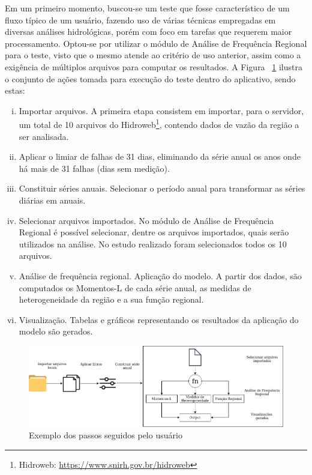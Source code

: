 \documentclass[12pt,english,brazil]{article}
\begin{document}
Em um primeiro momento, buscou-se um teste que fosse característico de um fluxo típico de um usuário, fazendo uso de várias técnicas empregadas em diversas análises hidrológicas, porém com foco em tarefas que requerem maior processamento. Optou-se por utilizar o módulo de Análise de Frequência Regional para o teste, visto que o mesmo atende ao critério de uso anterior, assim como a exigência de múltiplos arquivos para computar os resultados. A Figura ~\ref{usoWebSYHDA} ilustra o conjunto de ações tomada para execução do teste dentro do aplicativo, sendo estas:


\begin{enumerate}[i.]
  \item Importar arquivos. A primeira etapa consistem em importar, para o servidor, um total de 10 arquivos do Hidroweb\footnote{Hidroweb: \url{https://www.snirh.gov.br/hidroweb}}, contendo dados de vazão da região a ser analisada.
  \item Aplicar o limiar de falhas de 31 dias, eliminando da série anual os anos onde há mais de 31 falhas (dias sem medição).
  \item Constituir séries anuais. Selecionar o período anual para transformar as séries diárias em anuais.
  \item Selecionar arquivos importados. No módulo de Análise de Frequência Regional  é possível selecionar, dentre os arquivos importados, quais serão utilizados na análise. No estudo realizado foram selecionados todos os 10 arquivos.
  \item Análise de frequência regional. Aplicação do modelo. A partir dos dados, são computados os Momentos-L de cada série anual, as medidas de heterogeneidade da região e a sua função regional.
  \item Visualização. Tabelas e gráficos representando os resultados da aplicação do modelo são gerados.
\end{enumerate}

\begin{figure}[htbp]
  \centering 
  \includegraphics[scale=.4]{paperWSCAD2021/figures/useWebSYHDADrawio-horizontal.png}
  \caption{Exemplo dos passos seguidos pelo usuário}
  \label{usoWebSYHDA}
\end{figure}
\end{document}
